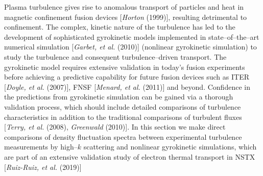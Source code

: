 \documentclass[a4paper,openany,12pt]{report}
\begin{document}
Plasma turbulence gives rise to anomalous transport of particles and heat in magnetic confinement fusion devices [\emph{Horton} (1999)], resulting detrimental to confinement. The complex, kinetic nature of the turbulence has led to the development of sophisticated gyrokinetic models implemented in state--of--the--art numerical simulation [\emph{Garbet, et al.} (2010)] (nonlinear gyrokinetic simulation) to study the turbulence and consequent turbulence--driven transport. The gyrokinetic model requires extensive validation in today's fusion experiments before achieving a predictive capability for future fusion devices such as ITER [\emph{Doyle, et al.} (2007)], FNSF [\emph{Menard, et al.} (2011)] and beyond. Confidence in the predictions from gyrokinetic simulation can be gained via a thorough validation process, which should include detailed comparisons of turbulence characteristics in addition to the traditional comparisons of turbulent fluxes 
[\emph{Terry, et al.} (2008), \emph{Greenwald} (2010)]. In this section we make direct comparisons of density fluctuation spectra between experimental turbulence measurements by high--$k$ scattering and nonlinear gyrokinetic simulations, which are part of an extensive validation study of electron thermal transport in NSTX [\emph{Ruiz-Ruiz, et al.} (2019)]

%
%
\end{document}
